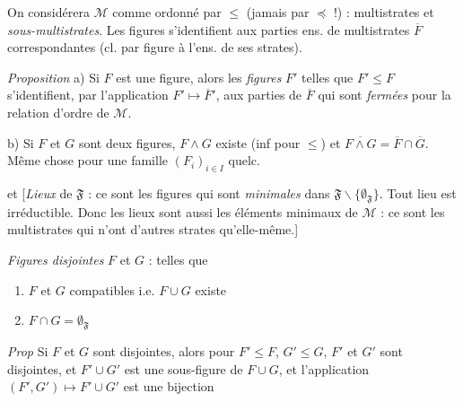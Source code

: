 \documentclass[11pt,a4paper]{article}
\begin{document}
On considérera $\mathcal{M}$ comme ordonné par $\leq$ (jamais par $\preccurlyeq$ !) : multistrates et \emph{sous-multistrates}. Les figures  s'identifient aux parties ens. de multistrates $\overline{F}$ correspondantes (cl. par figure à l'ens. de ses strates).

\emph{Proposition} \quad a) Si $F$ \struck{\ill{}} est une figure, alors les \emph{figures} $F'$ telles que $F' \leq F$ s'identifient, par l'application $F' \mapsto \overline{F}'$, aux parties de $\overline{F}$ qui sont \emph{fermées} pour la relation d'ordre \add{$\leq$} de $\mathcal{M}$.

b) Si $F$ et $G$ sont deux figures, $F \wedge G$ existe (inf pour $\leq$) et $\overline{F \wedge G} = \overline{F} \cap \overline{G}$. Même chose pour une famille $(F_i)_{i \in I}$ quelc. 

et \struck{\ill{}} [\emph{Lieux} de $\mathfrak{F}$ : ce sont les  figures qui sont \emph{minimales} dans $\mathfrak{F} \smallsetminus \lbrace \emptyset_{\mathfrak{F}} \rbrace$.  Tout lieu est  irréductible. Donc les lieux sont aussi les éléments minimaux de $\mathcal{M}$ : ce sont les multistrates qui n'ont d'autres strates qu'elle-même.] 

\emph{Figures disjointes} $F$ et $G$ : telles que
\begin{enumerate}
  \item[a)] $F$ et $G$ compatibles i.e. $F \cup G$ existe   
  \item[b)] $F \cap G = \emptyset_{\mathfrak{F}}$ \struck{\ill{}}
\end{enumerate}


\emph{Prop} \quad Si $F$ et $G$ sont disjointes, alors pour $F' \leq F$, $G' \leq G$, $F'$ et $G'$ sont disjointes, et $F' \cup G'$ est une sous-figure de $F \cup G$, et l'application $(F', G') \mapsto F' \cup G'$ est une bijection 
\end{document}
